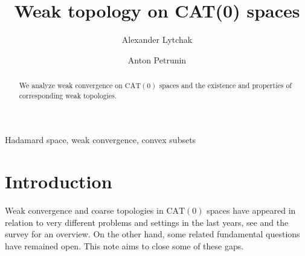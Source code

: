 \documentclass[12pt,leqno]{amsart}
\numberwithin{equation}{section}
\theoremstyle{remark}
\newcommand{\CAT}{\mathrm{CAT}}
\begin{document}
	\pagebreak
	
	
	\title{Weak topology on CAT(0) spaces}
	
	
	
	\author{Alexander Lytchak}

\author{Anton Petrunin}	
	
	\keywords
	{Hadamard space, weak convergence, convex subsets} 
	
	
	
	
	
	\begin{abstract}
	We analyze weak convergence on $\CAT(0)$ spaces and the existence and properties of corresponding weak topologies.
	\end{abstract}
	
	
	
	
	
	
	
	
	\maketitle

\section{Introduction}
Weak convergence and coarse topologies in $\CAT(0)$ spaces have appeared in relation to very different problems and settings in the last years, see \cite{Jost,Monod,Kirk,Bac3,Kell,Streets,Darvas, Gigli} and the survey \cite{Bac} for an overview.
On the other hand, some related fundamental questions have remained open.
This note aims to close some of these gaps. 
\end{document}

